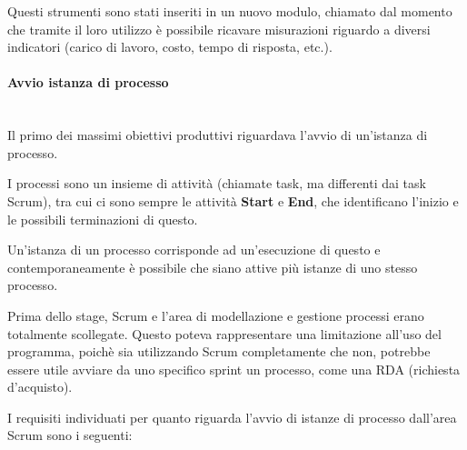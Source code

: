 Questi strumenti sono stati inseriti in un nuovo modulo, chiamato 
dal momento che tramite il loro utilizzo è possibile ricavare misurazioni
riguardo a diversi indicatori (carico di lavoro, costo, tempo di risposta,
etc.). %

\paragraph{Avvio istanza di processo} \mbox{} \\

Il primo dei massimi obiettivi produttivi riguardava l'avvio di un'istanza di
processo.

I processi sono un insieme di attività (chiamate task, ma differenti dai task
Scrum), tra cui ci sono sempre le attività \textbf{Start} e \textbf{End}, che
identificano l'inizio e le possibili terminazioni di questo.

Un'istanza di un processo corrisponde ad un'esecuzione di questo e
contemporaneamente è possibile che siano attive più istanze di uno stesso
processo.

Prima dello stage, Scrum e l'area di modellazione e gestione processi erano
totalmente scollegate. Questo poteva rappresentare una limitazione all'uso
del programma, poichè sia utilizzando Scrum completamente che non, potrebbe
essere utile avviare da uno specifico sprint un processo, come una RDA
(richiesta d'acquisto).

I requisiti individuati per quanto riguarda l'avvio di istanze di processo
dall'area Scrum sono i seguenti: \\

